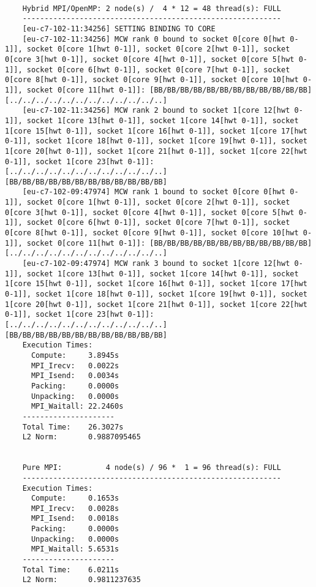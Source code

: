 \documentclass[11pt,a4paper]{article}
\begin{document}
\begin{lstlisting}
	
	Hybrid MPI/OpenMP: 2 node(s) /  4 * 12 = 48 thread(s): FULL
	-----------------------------------------------------------
	[eu-c7-102-11:34256] SETTING BINDING TO CORE
	[eu-c7-102-11:34256] MCW rank 0 bound to socket 0[core 0[hwt 0-1]], socket 0[core 1[hwt 0-1]], socket 0[core 2[hwt 0-1]], socket 0[core 3[hwt 0-1]], socket 0[core 4[hwt 0-1]], socket 0[core 5[hwt 0-1]], socket 0[core 6[hwt 0-1]], socket 0[core 7[hwt 0-1]], socket 0[core 8[hwt 0-1]], socket 0[core 9[hwt 0-1]], socket 0[core 10[hwt 0-1]], socket 0[core 11[hwt 0-1]]: [BB/BB/BB/BB/BB/BB/BB/BB/BB/BB/BB/BB][../../../../../../../../../../../..]
	[eu-c7-102-11:34256] MCW rank 2 bound to socket 1[core 12[hwt 0-1]], socket 1[core 13[hwt 0-1]], socket 1[core 14[hwt 0-1]], socket 1[core 15[hwt 0-1]], socket 1[core 16[hwt 0-1]], socket 1[core 17[hwt 0-1]], socket 1[core 18[hwt 0-1]], socket 1[core 19[hwt 0-1]], socket 1[core 20[hwt 0-1]], socket 1[core 21[hwt 0-1]], socket 1[core 22[hwt 0-1]], socket 1[core 23[hwt 0-1]]: [../../../../../../../../../../../..][BB/BB/BB/BB/BB/BB/BB/BB/BB/BB/BB/BB]
	[eu-c7-102-09:47974] MCW rank 1 bound to socket 0[core 0[hwt 0-1]], socket 0[core 1[hwt 0-1]], socket 0[core 2[hwt 0-1]], socket 0[core 3[hwt 0-1]], socket 0[core 4[hwt 0-1]], socket 0[core 5[hwt 0-1]], socket 0[core 6[hwt 0-1]], socket 0[core 7[hwt 0-1]], socket 0[core 8[hwt 0-1]], socket 0[core 9[hwt 0-1]], socket 0[core 10[hwt 0-1]], socket 0[core 11[hwt 0-1]]: [BB/BB/BB/BB/BB/BB/BB/BB/BB/BB/BB/BB][../../../../../../../../../../../..]
	[eu-c7-102-09:47974] MCW rank 3 bound to socket 1[core 12[hwt 0-1]], socket 1[core 13[hwt 0-1]], socket 1[core 14[hwt 0-1]], socket 1[core 15[hwt 0-1]], socket 1[core 16[hwt 0-1]], socket 1[core 17[hwt 0-1]], socket 1[core 18[hwt 0-1]], socket 1[core 19[hwt 0-1]], socket 1[core 20[hwt 0-1]], socket 1[core 21[hwt 0-1]], socket 1[core 22[hwt 0-1]], socket 1[core 23[hwt 0-1]]: [../../../../../../../../../../../..][BB/BB/BB/BB/BB/BB/BB/BB/BB/BB/BB/BB]
	Execution Times:
	  Compute:     3.8945s
	  MPI_Irecv:   0.0022s
	  MPI_Isend:   0.0034s
	  Packing:     0.0000s
	  Unpacking:   0.0000s
	  MPI_Waitall: 22.2460s
	---------------------
	Total Time:    26.3027s
	L2 Norm:       0.9887095465
	
	
	Pure MPI:          4 node(s) / 96 *  1 = 96 thread(s): FULL
	-----------------------------------------------------------
	Execution Times:
	  Compute:     0.1653s
	  MPI_Irecv:   0.0028s
	  MPI_Isend:   0.0018s
	  Packing:     0.0000s
	  Unpacking:   0.0000s
	  MPI_Waitall: 5.6531s
	---------------------
	Total Time:    6.0211s
	L2 Norm:       0.9811237635
	

\end{lstlisting}
\end{document}

